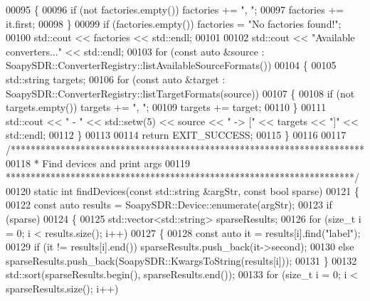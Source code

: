 \begin{DoxyCode}
00095     \{
00096         \textcolor{keywordflow}{if} (not factories.empty()) factories += \textcolor{stringliteral}{", "};
00097         factories += it.first;
00098     \}
00099     \textcolor{keywordflow}{if} (factories.empty()) factories = \textcolor{stringliteral}{"No factories found!"};
00100     std::cout << factories << std::endl;
00101 
00102     std::cout << \textcolor{stringliteral}{"Available converters..."} << std::endl;
00103     \textcolor{keywordflow}{for} (\textcolor{keyword}{const} \textcolor{keyword}{auto} &source : 
      SoapySDR::ConverterRegistry::listAvailableSourceFormats())
00104     \{
00105         std::string targets;
00106         \textcolor{keywordflow}{for} (\textcolor{keyword}{const} \textcolor{keyword}{auto} &target : SoapySDR::ConverterRegistry::listTargetFormats(source))
00107         \{
00108             \textcolor{keywordflow}{if} (not targets.empty()) targets += \textcolor{stringliteral}{", "};
00109             targets += target;
00110         \}
00111         std::cout << \textcolor{stringliteral}{" - "} << std::setw(5) << source << \textcolor{stringliteral}{" -> ["} << targets << \textcolor{stringliteral}{"]"} << std::endl;
00112     \}
00113 
00114     \textcolor{keywordflow}{return} EXIT\_SUCCESS;
00115 \}
00116 
00117 \textcolor{comment}{/***********************************************************************}
00118 \textcolor{comment}{ * Find devices and print args}
00119 \textcolor{comment}{ **********************************************************************/}
00120 \textcolor{keyword}{static} \textcolor{keywordtype}{int} findDevices(\textcolor{keyword}{const} std::string &argStr, \textcolor{keyword}{const} \textcolor{keywordtype}{bool} sparse)
00121 \{
00122     \textcolor{keyword}{const} \textcolor{keyword}{auto} results = SoapySDR::Device::enumerate(argStr);
00123     \textcolor{keywordflow}{if} (sparse)
00124     \{
00125         std::vector<std::string> sparseResults;
00126         \textcolor{keywordflow}{for} (\textcolor{keywordtype}{size\_t} i = 0; i < results.size(); i++)
00127         \{
00128             \textcolor{keyword}{const} \textcolor{keyword}{auto} it = results[i].find(\textcolor{stringliteral}{"label"});
00129             \textcolor{keywordflow}{if} (it != results[i].end()) sparseResults.push\_back(it->second);
00130             \textcolor{keywordflow}{else} sparseResults.push\_back(SoapySDR::KwargsToString(results[i]));
00131         \}
00132         std::sort(sparseResults.begin(), sparseResults.end());
00133         \textcolor{keywordflow}{for} (\textcolor{keywordtype}{size\_t} i = 0; i < sparseResults.size(); i++)

\end{DoxyCode}
